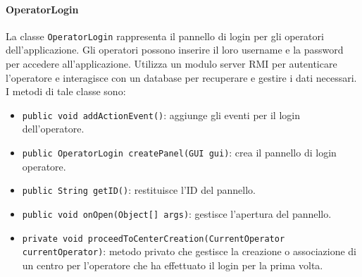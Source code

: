 \paragraph{OperatorLogin}
La classe \texttt{OperatorLogin} rappresenta il pannello di login per gli operatori dell'applicazione.
Gli operatori possono inserire il loro username e la password per accedere all'applicazione. 
Utilizza un modulo server RMI per autenticare l'operatore e interagisce con un database per recuperare e gestire i dati necessari.
I metodi di tale classe sono:
\begin{itemize}
    \item \texttt{public void addActionEvent()}: aggiunge gli eventi per il login dell'operatore.
    \item \texttt{public OperatorLogin createPanel(GUI gui)}: crea il pannello di login operatore.
    \item \texttt{public String getID()}: restituisce l'ID del pannello.
    \item \texttt{public void onOpen(Object[] args)}: gestisce l'apertura del pannello.
    \item \texttt{private void proceedToCenterCreation(CurrentOperator currentOperator)}: metodo privato che gestisce la creazione o associazione di un centro per l'operatore che ha effettuato il login per la prima volta.

\end{itemize}

